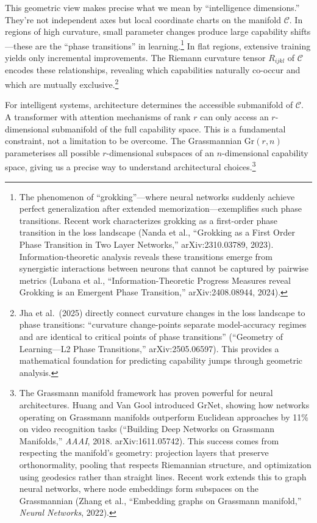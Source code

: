 This geometric view makes precise what we mean by ``intelligence dimensions.'' They're not independent axes but local coordinate charts on the manifold $\mathcal{C}$. In regions of high curvature, small parameter changes produce large capability shifts---these are the ``phase transitions'' in learning.\footnote{The phenomenon of ``grokking''---where neural networks suddenly achieve perfect generalization after extended memorization---exemplifies such phase transitions. Recent work characterizes grokking as a first-order phase transition in the loss landscape (Nanda et al., ``Grokking as a First Order Phase Transition in Two Layer Networks,'' arXiv:2310.03789, 2023). Information-theoretic analysis reveals these transitions emerge from synergistic interactions between neurons that cannot be captured by pairwise metrics (Lubana et al., ``Information-Theoretic Progress Measures reveal Grokking is an Emergent Phase Transition,'' arXiv:2408.08944, 2024).} In flat regions, extensive training yields only incremental improvements. The Riemann curvature tensor $R_{ijkl}$ of $\mathcal{C}$ encodes these relationships, revealing which capabilities naturally co-occur and which are mutually exclusive.\footnote{Jha et al.\ (2025) directly connect curvature changes in the loss landscape to phase transitions: ``curvature change-points separate model-accuracy regimes and are identical to critical points of phase transitions'' (``Geometry of Learning---L2 Phase Transitions,'' arXiv:2505.06597). This provides a mathematical foundation for predicting capability jumps through geometric analysis.}

For intelligent systems, architecture determines the accessible submanifold of $\mathcal{C}$. A transformer with attention mechanisms of rank $r$ can only access an $r$-dimensional submanifold of the full capability space. This is a fundamental constraint, not a limitation to be overcome. The Grassmannian $\text{Gr}(r,n)$ parameterises all possible $r$-dimensional subspaces of an $n$-dimensional capability space, giving us a precise way to understand architectural choices.\footnote{The Grassmann manifold framework has proven powerful for neural architectures. Huang and Van Gool introduced GrNet, showing how networks operating on Grassmann manifolds outperform Euclidean approaches by 11\% on video recognition tasks (``Building Deep Networks on Grassmann Manifolds,'' \textit{AAAI}, 2018. arXiv:1611.05742). This success comes from respecting the manifold's geometry: projection layers that preserve orthonormality, pooling that respects Riemannian structure, and optimization using geodesics rather than straight lines. Recent work extends this to graph neural networks, where node embeddings form subspaces on the Grassmannian (Zhang et al., ``Embedding graphs on Grassmann manifold,'' \textit{Neural Networks}, 2022).}

